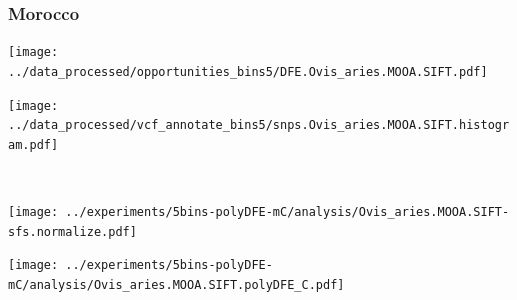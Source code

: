 \subsubsection{Morocco}

\begin{minipage}{0.49\linewidth}
    \texttt{[image: ../data\_processed/opportunities\_bins5/DFE.Ovis\_aries.MOOA.SIFT.pdf]}
\end{minipage}
\begin{minipage}{0.49\linewidth}
    \texttt{[image: ../data\_processed/vcf\_annotate\_bins5/snps.Ovis\_aries.MOOA.SIFT.histogram.pdf]}
\end{minipage}
\\
\begin{minipage}{0.49\linewidth}
    \texttt{[image: ../experiments/5bins-polyDFE-mC/analysis/Ovis\_aries.MOOA.SIFT-sfs.normalize.pdf]}
\end{minipage}
\begin{minipage}{0.49\linewidth}
    \texttt{[image: ../experiments/5bins-polyDFE-mC/analysis/Ovis\_aries.MOOA.SIFT.polyDFE\_C.pdf]}
\end{minipage}
\\ 
